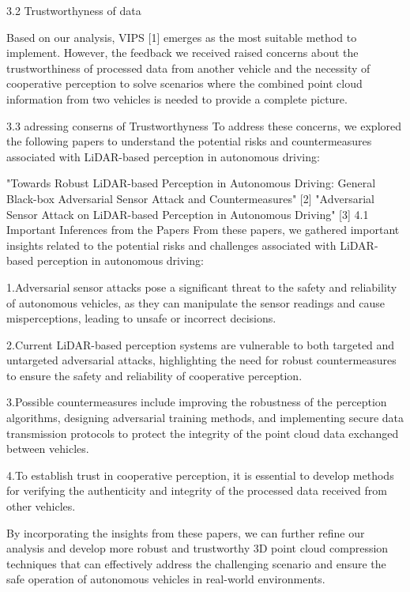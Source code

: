 \documentclass[conference]{IEEEtran}
\begin{document}
3.2 Trustworthyness of data

Based on our analysis, VIPS [1] emerges as the most suitable method to implement. However, the feedback we received raised concerns about the trustworthiness of processed data from another vehicle and the necessity of cooperative perception to solve scenarios where the combined point cloud information from two vehicles is needed to provide a complete picture.

3.3 adressing conserns of Trustworthyness
To address these concerns, we explored the following papers to understand the potential risks and countermeasures associated with LiDAR-based perception in autonomous driving:

"Towards Robust LiDAR-based Perception in Autonomous Driving: General Black-box Adversarial Sensor Attack and Countermeasures" [2]
"Adversarial Sensor Attack on LiDAR-based Perception in Autonomous Driving" [3]
4.1 Important Inferences from the Papers
From these papers, we gathered important insights related to the potential risks and challenges associated with LiDAR-based perception in autonomous driving:

1.Adversarial sensor attacks pose a significant threat to the safety and reliability of autonomous vehicles, as they can manipulate the sensor readings and cause misperceptions, leading to unsafe or incorrect decisions.

2.Current LiDAR-based perception systems are vulnerable to both targeted and untargeted adversarial attacks, highlighting the need for robust countermeasures to ensure the safety and reliability of cooperative perception.

3.Possible countermeasures include improving the robustness of the perception algorithms, designing adversarial training methods, and implementing secure data transmission protocols to protect the integrity of the point cloud data exchanged between vehicles.

4.To establish trust in cooperative perception, it is essential to develop methods for verifying the authenticity and integrity of the processed data received from other vehicles.

By incorporating the insights from these papers, we can further refine our analysis and develop more robust and trustworthy 3D point cloud compression techniques that can effectively address the challenging scenario and ensure the safe operation of autonomous vehicles in real-world environments.
\end{document}
